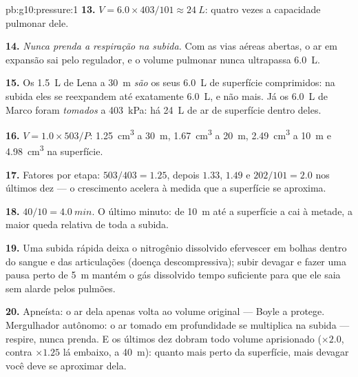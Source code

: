 \begin{solution}{pb:g10:pressure:1}
\textbf{13.} $V = 6.0 \times 403/101 \approx \qty{24}{L}$: quatro vezes a
capacidade pulmonar dele.

\textbf{14.} \emph{Nunca prenda a respiração na subida.} Com as vias
aéreas abertas, o ar em expansão sai pelo regulador, e o volume pulmonar
nunca ultrapassa \qty{6.0}{L}.

\textbf{15.} Os \qty{1.5}{L} de Lena a \qty{30}{m} \emph{são} os seus
\qty{6.0}{L} de superfície comprimidos: na subida eles se reexpandem até
exatamente \qty{6.0}{L}, e não mais. Já os \qty{6.0}{L} de Marco foram
\emph{tomados} a \qty{403}{kPa}: há \qty{24}{L} de ar de superfície
dentro deles.

\textbf{16.} $V = 1.0 \times 503/P$: \qty{1.25}{cm^3} a \qty{30}{m},
\qty{1.67}{cm^3} a \qty{20}{m}, \qty{2.49}{cm^3} a \qty{10}{m} e
\qty{4.98}{cm^3} na superfície.

\textbf{17.} Fatores por etapa: $503/403 = 1.25$, depois $1.33$, $1.49$
e $202/101 = 2.0$ nos últimos dez  --- o crescimento acelera à
medida que a superfície se aproxima.

\textbf{18.} $40/10 = \qty{4.0}{min}$. O último minuto: de \qty{10}{m}
até a superfície a  cai à metade, a maior queda relativa
de toda a subida.

\textbf{19.} Uma subida rápida deixa o nitrogênio dissolvido efervescer
em bolhas dentro do sangue e das articulações (doença descompressiva);
subir devagar e fazer uma pausa perto de \qty{5}{m} mantém o gás
dissolvido tempo suficiente para que ele saia sem alarde pelos pulmões.

\textbf{20.} Apneísta: o ar dela apenas volta ao volume original ---
Boyle a protege. Mergulhador autônomo: o ar tomado em profundidade se
multiplica na subida --- respire, nunca prenda. E os últimos dez 
dobram todo volume aprisionado ($\times 2.0$, contra $\times 1.25$ lá
embaixo, a \qty{40}{m}): quanto mais perto da superfície, mais devagar
você deve se aproximar dela.
\end{solution}
